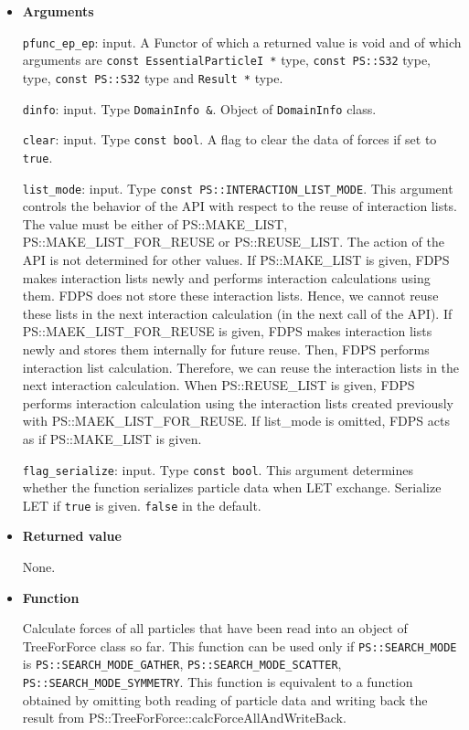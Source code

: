 \begin{itemize}

\item {\bf Arguments}

{\tt pfunc\_ep\_ep}: input. A Functor of which a returned value is
void and of which arguments are {\tt const EssentialParticleI *} type, {\tt const PS::S32} type,  type, {\tt const PS::S32} type and {\tt Result *} type.

{\tt dinfo}: input. Type {\tt DomainInfo \&}. Object of {\tt DomainInfo} class.

{\tt clear}: input. Type {\tt const bool}. A flag to clear the data of forces if set to {\tt true}.

{\tt list\_mode}: input. Type {\tt const PS::INTERACTION\_LIST\_MODE}. This argument controls the behavior of the API with respect to the reuse of interaction lists. The value must be either of PS::MAKE\_LIST, PS::MAKE\_LIST\_FOR\_REUSE or PS::REUSE\_LIST. The action of the API is not determined for other values. If PS::MAKE\_LIST is given, FDPS makes interaction lists newly and performs interaction calculations using them. FDPS does not store these interaction lists. Hence, we cannot reuse these lists in the next interaction calculation (in the next call of the API). If PS::MAEK\_LIST\_FOR\_REUSE is given, FDPS makes interaction lists newly and stores them internally for future reuse. Then, FDPS performs interaction list calculation. Therefore, we can reuse the interaction lists in the next interaction calculation. When PS::REUSE\_LIST is given, FDPS performs interaction calculation using the interaction lists created previously with PS::MAEK\_LIST\_FOR\_REUSE. If list\_mode is omitted, FDPS acts as if PS::MAKE\_LIST is given.

\texttt{flag\_serialize}: input. Type \texttt{const bool}. This argument determines whether the function serializes particle data when LET exchange. Serialize LET if \texttt{true} is given. \texttt{false} in the default.

\item {\bf Returned value}

None.

\item {\bf Function}

Calculate forces of all particles that have been read into an object of TreeForForce class so far. This function can be used only if \texttt{PS::SEARCH\_MODE} is \texttt{PS::SEARCH\_MODE\_GATHER}, \newline  \texttt{PS::SEARCH\_MODE\_SCATTER}, \texttt{PS::SEARCH\_MODE\_SYMMETRY}. This function is equivalent to a function obtained by omitting both reading of particle data and writing back the result from PS::TreeForForce::calcForceAllAndWriteBack.


\end{itemize}
